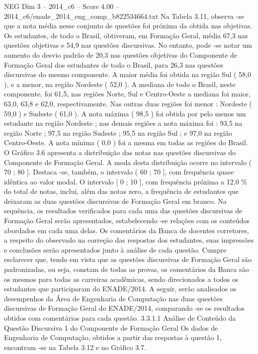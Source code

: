\begin{textsample}{NEG Dim 3 – 2014\_c6 – Score 4.00 – 2014\_c6/enade\_2014\_eng\_comp\_b822534664.txt}
Na Tabela 3.11, observa -se que a nota média nesse conjunto de questões foi próxima da obtida nas objetivas.
Os estudantes, de todo o Brasil, obtiveram, em Formação Geral, média 67,3 nas questões objetivas e 54,9 nas questões discursivas.
No entanto, pode -se notar um aumento do desvio padrão de 20,3 nas questões objetivas do Componente de Formação Geral dos estudantes de todo o Brasil, para 26,3 nas questões discursivas do mesmo componente.
A maior média foi obtida na região Sul ( 58,0 ), e a menor, na região Nordeste ( 52,0 ).
A mediana de todo o Brasil, neste componente, foi 61,5, nas regiões Norte, Sul e Centro-Oeste a mediana foi maior, 63,0, 63,8 e 62,0, respectivamente.
Nas outras duas regiões foi menor : Nordeste ( 59,0 ) e Sudeste ( 61,0 ).
A nota máxima ( 98,5 ) foi obtida por pelo menos um estudante na região Nordeste ; nas demais regiões a nota máxima foi : 93,5 na região Norte ; 97,5 na região Sudeste ; 95,5 na região Sul ; e 97,0 na região Centro-Oeste.
A nota mínima ( 0,0 ) foi a mesma em todas as regiões do Brasil.
O Gráfico 3.6 apresenta a distribuição das notas nas questões discursivas do Componente de Formação Geral.
A moda desta distribuição ocorre no intervalo ( 70 ; 80 ].
Destaca -se, também, o intervalo ( 60 ; 70 ], com frequência quase idêntica ao valor modal.
O intervalo [ 0 ; 10 ], com frequência próxima a 12,0 \% do total de notas, inclui, além das notas zero, a frequência de estudantes que deixaram as duas questões discursivas de Formação Geral em branco.
Na sequência, os resultados verificados para cada uma das questões discursivas de Formação Geral serão apresentados, estabelecendo -se relações com os conteúdos abordados em cada uma delas.
Os comentários da Banca de docentes corretores, a respeito do observado na correção das respostas dos estudantes, suas impressões e conclusões serão apresentados junto à análise de cada questão.
Cumpre esclarecer que, tendo em vista que as questões discursivas de Formação Geral são padronizadas, ou seja, constam de todas as provas, os comentários da Banca são os mesmos para todas as carreiras acadêmicas, sendo direcionados a todos os estudantes que participaram do ENADE/2014.
A seguir, serão analisados os desempenhos da Área de Engenharia de Computação nas duas questões discursivas de Formação Geral do ENADE/2014, comparando -se os resultados obtidos com comentários para cada questão. 3.3.1.1 Análise de Conteúdo da Questão Discursiva 1 do Componente de Formação Geral Os dados de Engenharia de Computação, obtidos a partir das respostas à questão 1, encontram -se na Tabela 3.12 e no Gráfico 3.7.

\end{textsample}
